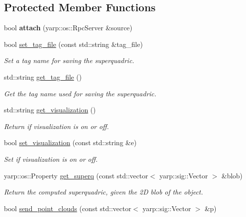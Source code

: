 \subsection*{Protected Member Functions}
\begin{DoxyCompactItemize}
\item 
bool {\bfseries attach} (yarp\-::os\-::\-Rpc\-Server \&source)\label{classSuperqModule_a561e16c3b62e17a2fb96193c079bd970}

\item 
bool \hyperlink{classSuperqModule_ae9f0cfead2c367e4c3aa25292b5c42c6}{set\-\_\-tag\-\_\-file} (const std\-::string \&tag\-\_\-file)
\begin{DoxyCompactList}\small\item\em Set a tag name for saving the superquadric. \end{DoxyCompactList}\item 
std\-::string \hyperlink{classSuperqModule_ac5475155a5a1b05e5fdef54699cef1a6}{get\-\_\-tag\-\_\-file} ()
\begin{DoxyCompactList}\small\item\em Get the tag name used for saving the superquadric. \end{DoxyCompactList}\item 
std\-::string \hyperlink{classSuperqModule_a89be4778051c4dd19339021448f89b41}{get\-\_\-visualization} ()
\begin{DoxyCompactList}\small\item\em Return if visualization is on or off. \end{DoxyCompactList}\item 
bool \hyperlink{classSuperqModule_ae4fc54ad89b3ee72ab5ea8c8b5065866}{set\-\_\-visualization} (const std\-::string \&e)
\begin{DoxyCompactList}\small\item\em Set if visualization is on or off. \end{DoxyCompactList}\item 
yarp\-::os\-::\-Property \hyperlink{classSuperqModule_a4a28afabfeac67e807dcc32845b41e0c}{get\-\_\-superq} (const std\-::vector$<$ yarp\-::sig\-::\-Vector $>$ \&blob)
\begin{DoxyCompactList}\small\item\em Return the computed superquadric, given the 2\-D blob of the object. \end{DoxyCompactList}\item 
bool \hyperlink{classSuperqModule_aa5a3fb751dd83d96004fceebab14c139}{send\-\_\-point\-\_\-clouds} (const std\-::vector$<$ yarp\-::sig\-::\-Vector $>$ \&p)

\end{DoxyCompactItemize}
